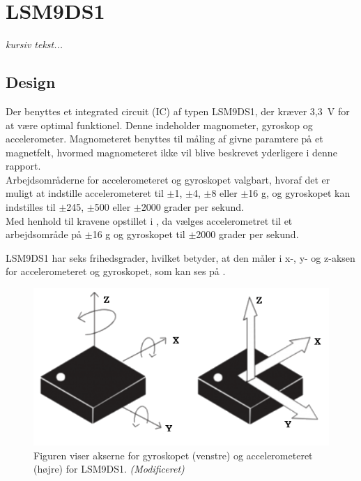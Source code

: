 \section{LSM9DS1}\label{sec_design_LSM9DS1}
\textit{kursiv tekst...}

\subsection{Design}
Der benyttes et integrated circuit (IC) af typen LSM9DS1, der kræver 3,3~V for at være optimal funktionel. Denne indeholder magnometer, gyroskop og accelerometer. Magnometeret benyttes til måling af givne paramtere på et magnetfelt, hvormed magnometeret ikke vil blive beskrevet yderligere i denne rapport. \\
Arbejdsområderne for accelerometeret og gyroskopet valgbart, hvoraf det er muligt at indstille accelerometeret til $\pm$1, $\pm$4, $\pm$8 eller $\pm$16 g, og gyroskopet kan indstilles til $\pm$245, $\pm$500 eller $\pm$2000 grader per sekund. \citep{Jimb02016,STMicroelectronics2016} \\
Med henhold til kravene opstillet i , da vælges accelerometret til et arbejdsområde på  $\pm$16 g og gyroskopet til $\pm$2000 grader per sekund. 

LSM9DS1 har seks frihedsgrader, hvilket betyder, at den måler i x-, y- og z-aksen for accelerometeret og gyroskopet, som kan ses på . %
\citep{STMicroelectronics2016}\newline 
\begin{figure}[H]
	\centering
	\includegraphics[scale=0.4]{figures/cDesign/LSM9DS1.png}
	\caption{Figuren viser akserne for gyroskopet (venstre) og accelerometeret (højre) for LSM9DS1. \citep{Jimb02016} \textit{(Modificeret)}}
	\label{vores_IC}
\end{figure}

